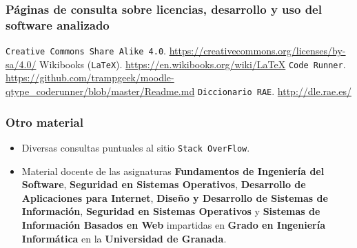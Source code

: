 

\printbibliography[heading=bibempty]

\bigskip
\subsubsection*{Páginas de consulta sobre licencias, desarrollo y uso del software analizado}
 {\tt Creative Commons Share Alike 4.0}. \url{https://creativecommons.org/licenses/by-sa/4.0/}
 Wikibooks ({\tt LaTeX}). \url{https://en.wikibooks.org/wiki/LaTeX}
 {\tt Code Runner}. \url{https://github.com/trampgeek/moodle-qtype_coderunner/blob/master/Readme.md}
 {\tt Diccionario RAE}. \url{http://dle.rae.es/}

\bigskip
\subsubsection*{Otro material}
\begin{itemize}
	\item Diversas consultas puntuales al sitio {\tt Stack OverFlow}.
	\item Material docente de las asignaturas \textbf{Fundamentos de Ingeniería del Software}, \textbf{Seguridad en Sistemas Operativos}, \textbf{Desarrollo de Aplicaciones para Internet}, \textbf{Diseño y Desarrollo de Sistemas de Información}, \textbf{Seguridad en Sistemas Operativos} y \textbf{Sistemas de Información Basados en Web} impartidas en \textbf{Grado en Ingeniería Informática} en la \textbf{Universidad de Granada}.
\end{itemize}